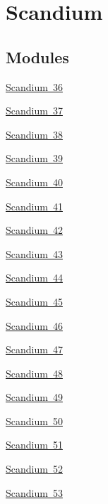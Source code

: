 \hypertarget{group___isotope_const-_scandium}{}\section{Scandium}
\label{group___isotope_const-_scandium}
\subsection*{Modules}
\begin{DoxyCompactItemize}
\item 
\mbox{\hyperlink{group___isotope_const-_scandium-_sc36}{Scandium 36}}
\item 
\mbox{\hyperlink{group___isotope_const-_scandium-_sc37}{Scandium 37}}
\item 
\mbox{\hyperlink{group___isotope_const-_scandium-_sc38}{Scandium 38}}
\item 
\mbox{\hyperlink{group___isotope_const-_scandium-_sc39}{Scandium 39}}
\item 
\mbox{\hyperlink{group___isotope_const-_scandium-_sc40}{Scandium 40}}
\item 
\mbox{\hyperlink{group___isotope_const-_scandium-_sc41}{Scandium 41}}
\item 
\mbox{\hyperlink{group___isotope_const-_scandium-_sc42}{Scandium 42}}
\item 
\mbox{\hyperlink{group___isotope_const-_scandium-_sc43}{Scandium 43}}
\item 
\mbox{\hyperlink{group___isotope_const-_scandium-_sc44}{Scandium 44}}
\item 
\mbox{\hyperlink{group___isotope_const-_scandium-_sc45}{Scandium 45}}
\item 
\mbox{\hyperlink{group___isotope_const-_scandium-_sc46}{Scandium 46}}
\item 
\mbox{\hyperlink{group___isotope_const-_scandium-_sc47}{Scandium 47}}
\item 
\mbox{\hyperlink{group___isotope_const-_scandium-_sc48}{Scandium 48}}
\item 
\mbox{\hyperlink{group___isotope_const-_scandium-_sc49}{Scandium 49}}
\item 
\mbox{\hyperlink{group___isotope_const-_scandium-_sc50}{Scandium 50}}
\item 
\mbox{\hyperlink{group___isotope_const-_scandium-_sc51}{Scandium 51}}
\item 
\mbox{\hyperlink{group___isotope_const-_scandium-_sc52}{Scandium 52}}
\item 
\mbox{\hyperlink{group___isotope_const-_scandium-_sc53}{Scandium 53}}

\end{DoxyCompactItemize}
